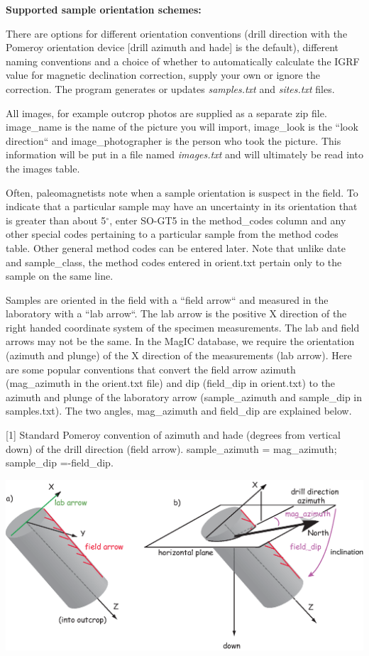 \documentclass[11pt]{book}
\begin{document}
{{{\bf Supported sample orientation schemes:}

  There are options for
 different orientation conventions (drill direction with the Pomeroy orientation device  [drill azimuth and hade] is the default), different naming conventions and a choice of whether to automatically calculate the IGRF value for magnetic declination correction, supply your own or ignore the correction.  The program generates or updates {\it samples.txt} and {\it sites.txt} files.

 All images, for example outcrop photos are supplied as a separate zip file. image\_name is the name of the picture you will import, image\_look is the ``look direction`` and image\_photographer is the person who took the picture. This information will be put in a file named {\it images.txt} and will ultimately be read into the images table.

Often, paleomagnetists note when a sample orientation is suspect in the field. To indicate that a particular sample may have an uncertainty in its orientation that is greater than about 5$^{\circ}$, enter SO-GT5 in the method\_codes column and any other special codes pertaining to a particular sample from the method codes table. Other general method codes can be entered later. Note that unlike date and sample\_class, the method codes entered in orient.txt pertain only to the sample on the same line.

Samples are oriented in the field with a ``field arrow`` and measured in the laboratory with a ``lab arrow``. The lab arrow is the positive X direction of the right handed coordinate system of the specimen measurements. The lab and field arrows may not be the same. In the MagIC database, we require the orientation (azimuth and plunge) of the X direction of the measurements (lab arrow). Here are some popular conventions that convert the field arrow azimuth (mag\_azimuth in the orient.txt file) and dip (field\_dip in orient.txt) to the azimuth and plunge of the laboratory arrow (sample\_azimuth and sample\_dip in samples.txt). The two angles, mag\_azimuth and field\_dip are explained below.

{\parindent 0pt
[1] Standard Pomeroy convention of azimuth and hade (degrees from vertical down) of the drill direction (field arrow). sample\_azimuth = mag\_azimuth; sample\_dip =-field\_dip.

  \includegraphics[width=15cm]{EPSFiles/orcon_1.eps}

}}}
\end{document}
